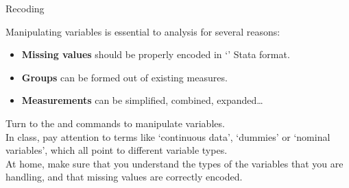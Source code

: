 \documentclass{beamer}
\begin{document}
	\begin{frame}[t]{Recoding}
		
		Manipulating variables is essential to analysis for several reasons:
		
		\begin{itemize}
			\item \textbf{Missing values} should be properly encoded in `' Stata format.
			\item \textbf{Groups} can be formed out of existing measures.
			\item \textbf{Measurements} can be simplified, combined, expanded…
		\end{itemize}

		Turn to the  and  commands to manipulate variables.\\[.5em]
		
		In class, pay attention to terms like `continuous data', `dummies' or `nominal variables', which all point to different variable types.\\[.5em]
		
		At home, make sure that you understand the types of the variables that you are handling, and that missing values are correctly encoded.
	\end{frame}
	
		
\end{document}
